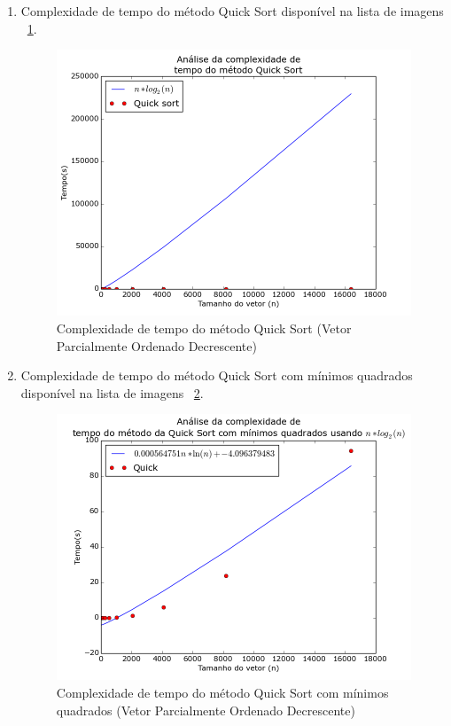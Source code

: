 \documentclass[12pt,a4paper,twoside]{report}
\begin{document}
\begin{enumerate}
\begin{enumerate}
											\item Complexidade de tempo do método Quick Sort disponível na lista de imagens ~\ref{fig:QuickPlot2POD}.
											\begin{figure}[!h]
												\centering
												\includegraphics[scale=0.6]{../imagens/Quick/Quick_plot_2_parcialmente_ordenado_decrescente.png}
												\caption{Complexidade de tempo do método Quick Sort (Vetor Parcialmente Ordenado Decrescente) \label{fig:QuickPlot2POD}}
											\end{figure}


											\item Complexidade de tempo do método Quick Sort com mínimos quadrados disponível na lista de imagens  ~\ref{fig:QuickPlot3POD}.
											\begin{figure}[!h]
												\centering
												\includegraphics[scale=0.6]{../imagens/Quick/Quick_plot_3_parcialmente_ordenado_decrescente.png}
												\caption{Complexidade de tempo do método Quick Sort com mínimos quadrados (Vetor Parcialmente Ordenado Decrescente) \label{fig:QuickPlot3POD}}
											\end{figure}

										\end{enumerate}


\end{enumerate}
\end{document}
